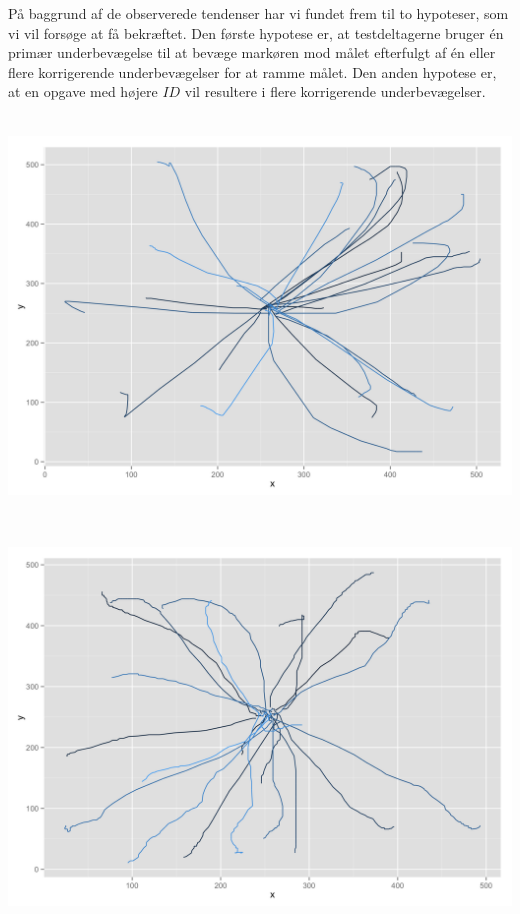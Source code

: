 På baggrund af de observerede tendenser har vi fundet frem til to hypoteser, som vi vil forsøge at få bekræftet. Den første hypotese er, at testdeltagerne bruger én primær underbevægelse til at bevæge markøren mod målet efterfulgt af én eller flere korrigerende underbevægelser for at ramme målet. Den anden hypotese er, at en opgave med højere $ID$ vil resultere i flere korrigerende underbevægelser.\\\\
\begin{minipage}{\linewidth}
	\begin{minipage}{.45\linewidth}
		\centering
		\includegraphics[width=\linewidth]{images/plots/plot_analysis_qualitative_140}
		\label{fig:movement_random_person_1}
	\end{minipage}
	\begin{minipage}[b]{0.1\linewidth}
	~
	\end{minipage}
	\begin{minipage}{.45\linewidth}
		\centering
		\includegraphics[width=\linewidth]{images/plots/plot_analysis_qualitative_248}
		\label{fig:movement_random_person_2}
	\end{minipage}
\end{minipage}

